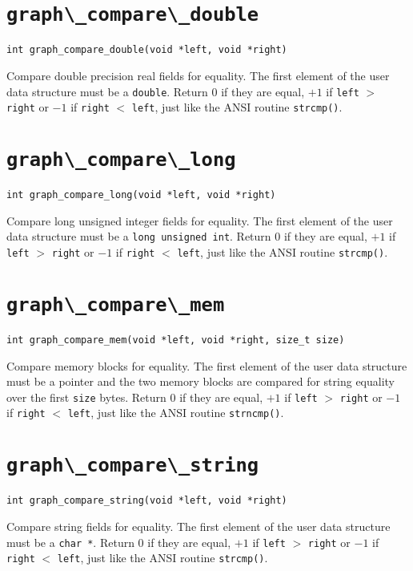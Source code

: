 \section{\protect\verb+graph\_compare\_double+}
\begin{verbatim}
int graph_compare_double(void *left, void *right)
\end{verbatim}
Compare double precision real fields for equality. The first element of
the user data structure must be a {\tt double}. Return 0 if they are
equal, $+1$ if {\tt left} $>$ {\tt right} or $-1$ if {\tt right} $<$
{\tt left}, just like the ANSI routine {\tt strcmp()}. 

\section{\protect\verb+graph\_compare\_long+}
\begin{verbatim}
int graph_compare_long(void *left, void *right)
\end{verbatim}
Compare long unsigned integer fields for equality. The first element of
the user data structure must be a {\tt long unsigned int}. Return 0 if they are
equal, $+1$ if {\tt left} $>$ {\tt right} or $-1$ if {\tt right} $<$
{\tt left}, just like the ANSI routine {\tt strcmp()}. 

\section{\protect\verb+graph\_compare\_mem+}
\begin{verbatim}
int graph_compare_mem(void *left, void *right, size_t size)
\end{verbatim}
Compare memory blocks for equality. The first element of
the user data structure must be a pointer and the two memory blocks are compared
for string equality over the first {\tt size} bytes. Return 0 if they are
equal, $+1$ if {\tt left} $>$ {\tt right} or $-1$ if {\tt right} $<$
{\tt left}, just like the ANSI routine {\tt strncmp()}. 

\section{\protect\verb+graph\_compare\_string+}
\begin{verbatim}
int graph_compare_string(void *left, void *right)
\end{verbatim}
Compare string fields for equality. The first element of
the user data structure must be a {\tt char *}. Return 0 if they are
equal, $+1$ if {\tt left} $>$ {\tt right} or $-1$ if {\tt right} $<$
{\tt left}, just like the ANSI routine {\tt strcmp()}. 

